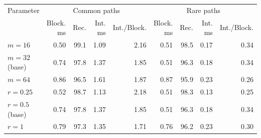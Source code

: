 \begin{tabular}{lrrrrrrrr}
\toprule
Parameter & \multicolumn{4}{c}{Common paths} & \multicolumn{4}{c}{Rare paths}\\
\cmidrule(lr){2-5}\cmidrule(lr){6-9}
 & Block. ms & Rec. & Int. ms & Int./Block. & Block. ms & Rec. & Int. ms & Int./Block.\\
\midrule
$m=16$ & 0.50 & 99.1 & 1.09 & 2.16 & 0.51 & 98.5 & 0.17 & 0.34\\
$m=32$ (base) & 0.74 & 97.8 & 1.37 & 1.85 & 0.51 & 96.3 & 0.18 & 0.34\\
$m=64$ & 0.86 & 96.5 & 1.61 & 1.87 & 0.87 & 95.9 & 0.23 & 0.26\\
$r=0.25$ & 0.52 & 98.7 & 1.13 & 2.18 & 0.51 & 98.3 & 0.13 & 0.25\\
$r=0.5$ (base) & 0.74 & 97.8 & 1.37 & 1.85 & 0.51 & 96.3 & 0.18 & 0.34\\
$r=1$ & 0.79 & 97.3 & 1.35 & 1.71 & 0.76 & 96.2 & 0.23 & 0.30\\
\bottomrule
\end{tabular}
